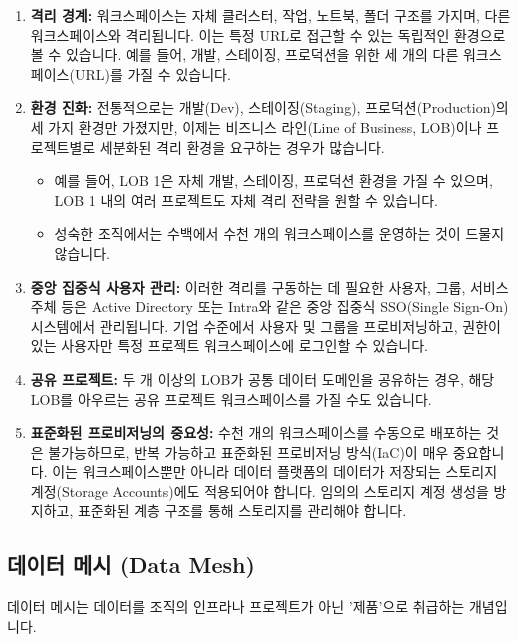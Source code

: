 \documentclass[11pt,a4paper]{article}
\theoremstyle{definition}
\begin{document}
\begin{enumerate}
    \item \textbf{격리 경계:}
    워크스페이스는 자체 클러스터, 작업, 노트북, 폴더 구조를 가지며, 다른 워크스페이스와 격리됩니다. 이는 특정 URL로 접근할 수 있는 독립적인 환경으로 볼 수 있습니다. 예를 들어, 개발, 스테이징, 프로덕션을 위한 세 개의 다른 워크스페이스(URL)를 가질 수 있습니다.

    \item \textbf{환경 진화:}
    전통적으로는 개발(Dev), 스테이징(Staging), 프로덕션(Production)의 세 가지 환경만 가졌지만, 이제는 비즈니스 라인(Line of Business, LOB)이나 프로젝트별로 세분화된 격리 환경을 요구하는 경우가 많습니다.
    \begin{itemize}
        \item 예를 들어, LOB 1은 자체 개발, 스테이징, 프로덕션 환경을 가질 수 있으며, LOB 1 내의 여러 프로젝트도 자체 격리 전략을 원할 수 있습니다.
        \item 성숙한 조직에서는 수백에서 수천 개의 워크스페이스를 운영하는 것이 드물지 않습니다.
    \end{itemize}

    \item \textbf{중앙 집중식 사용자 관리:}
    이러한 격리를 구동하는 데 필요한 사용자, 그룹, 서비스 주체 등은 Active Directory 또는 Intra와 같은 중앙 집중식 SSO(Single Sign-On) 시스템에서 관리됩니다. 기업 수준에서 사용자 및 그룹을 프로비저닝하고, 권한이 있는 사용자만 특정 프로젝트 워크스페이스에 로그인할 수 있습니다.

    \item \textbf{공유 프로젝트:}
    두 개 이상의 LOB가 공통 데이터 도메인을 공유하는 경우, 해당 LOB를 아우르는 공유 프로젝트 워크스페이스를 가질 수도 있습니다.

    \item \textbf{표준화된 프로비저닝의 중요성:}
    수천 개의 워크스페이스를 수동으로 배포하는 것은 불가능하므로, 반복 가능하고 표준화된 프로비저닝 방식(IaC)이 매우 중요합니다. 이는 워크스페이스뿐만 아니라 데이터 플랫폼의 데이터가 저장되는 스토리지 계정(Storage Accounts)에도 적용되어야 합니다. 임의의 스토리지 계정 생성을 방지하고, 표준화된 계층 구조를 통해 스토리지를 관리해야 합니다.
\end{enumerate}

\subsection{데이터 메시 (Data Mesh)}
데이터 메시는 데이터를 조직의 인프라나 프로젝트가 아닌 '제품'으로 취급하는 개념입니다.
\end{document}
